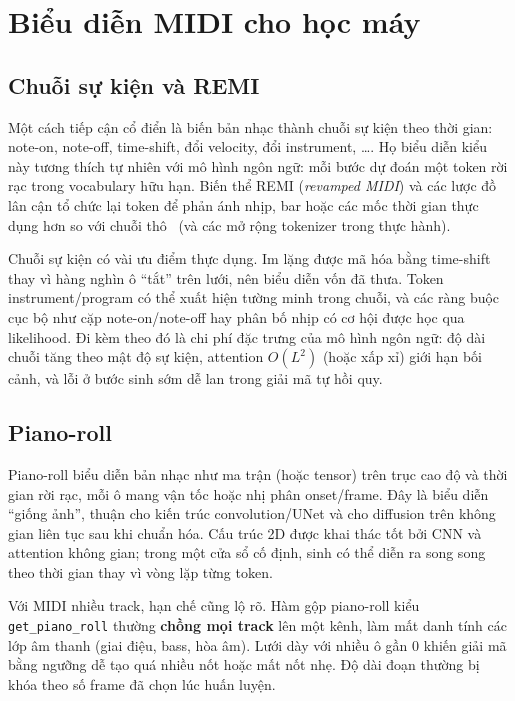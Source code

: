 \section{Biểu diễn MIDI cho học máy}
\label{sec:ch2-midi-repr}

\subsection{Chuỗi sự kiện và REMI}

Một cách tiếp cận cổ điển là biến bản nhạc thành chuỗi sự kiện theo thời gian: note-on, note-off, time-shift, đổi velocity, đổi instrument, \ldots. Họ biểu diễn kiểu này tương thích tự nhiên với mô hình ngôn ngữ: mỗi bước dự đoán một token rời rạc trong vocabulary hữu hạn. Biến thể REMI (\textit{revamped MIDI}) và các lược đồ lân cận tổ chức lại token để phản ánh nhịp, bar hoặc các mốc thời gian thực dụng hơn so với chuỗi thô~\cite{huang2018music} (và các mở rộng tokenizer trong thực hành).

Chuỗi sự kiện có vài ưu điểm thực dụng. Im lặng được mã hóa bằng time-shift thay vì hàng nghìn ô ``tắt'' trên lưới, nên biểu diễn vốn đã thưa. Token instrument/program có thể xuất hiện tường minh trong chuỗi, và các ràng buộc cục bộ như cặp note-on/note-off hay phân bố nhịp có cơ hội được học qua likelihood. Đi kèm theo đó là chi phí đặc trưng của mô hình ngôn ngữ: độ dài chuỗi tăng theo mật độ sự kiện, attention $O(L^2)$ (hoặc xấp xỉ) giới hạn bối cảnh, và lỗi ở bước sinh sớm dễ lan trong giải mã tự hồi quy.

\subsection{Piano-roll}

Piano-roll biểu diễn bản nhạc như ma trận (hoặc tensor) trên trục cao độ và thời gian rời rạc, mỗi ô mang vận tốc hoặc nhị phân onset/frame. Đây là biểu diễn ``giống ảnh'', thuận cho kiến trúc convolution/UNet và cho diffusion trên không gian liên tục sau khi chuẩn hóa. Cấu trúc 2D được khai thác tốt bởi CNN và attention không gian; trong một cửa sổ cố định, sinh có thể diễn ra song song theo thời gian thay vì vòng lặp từng token.

Với MIDI nhiều track, hạn chế cũng lộ rõ. Hàm gộp piano-roll kiểu \texttt{get\_piano\_roll} thường \textbf{chồng mọi track} lên một kênh, làm mất danh tính các lớp âm thanh (giai điệu, bass, hòa âm). Lưới dày với nhiều ô gần 0 khiến giải mã bằng ngưỡng dễ tạo quá nhiều nốt hoặc mất nốt nhẹ. Độ dài đoạn thường bị khóa theo số frame đã chọn lúc huấn luyện.

